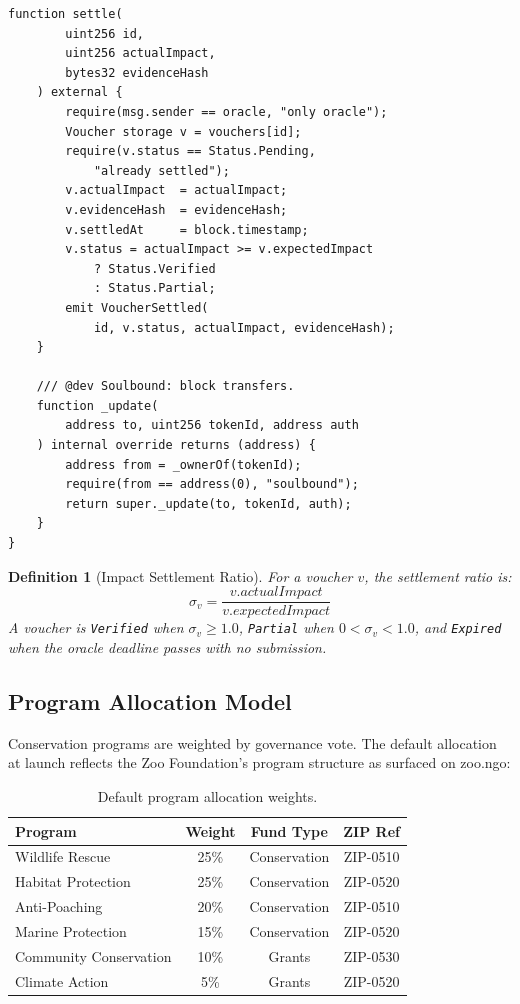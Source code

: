 \documentclass[11pt,letterpaper]{article}
\newtheorem{definition}{Definition}[section]
\begin{document}
\begin{lstlisting}[language=Solidity,caption=ImpactVoucher contract]
    function settle(
        uint256 id,
        uint256 actualImpact,
        bytes32 evidenceHash
    ) external {
        require(msg.sender == oracle, "only oracle");
        Voucher storage v = vouchers[id];
        require(v.status == Status.Pending,
            "already settled");
        v.actualImpact  = actualImpact;
        v.evidenceHash  = evidenceHash;
        v.settledAt     = block.timestamp;
        v.status = actualImpact >= v.expectedImpact
            ? Status.Verified
            : Status.Partial;
        emit VoucherSettled(
            id, v.status, actualImpact, evidenceHash);
    }

    /// @dev Soulbound: block transfers.
    function _update(
        address to, uint256 tokenId, address auth
    ) internal override returns (address) {
        address from = _ownerOf(tokenId);
        require(from == address(0), "soulbound");
        return super._update(to, tokenId, auth);
    }
}
\end{lstlisting}

\begin{definition}[Impact Settlement Ratio]
For a voucher $v$, the settlement ratio is:
\begin{equation}
    \sigma_v = \frac{v.\textit{actualImpact}}{v.\textit{expectedImpact}}
\end{equation}
A voucher is \texttt{Verified} when $\sigma_v \geq 1.0$, \texttt{Partial} when $0 < \sigma_v < 1.0$, and \texttt{Expired} when the oracle deadline passes with no submission.
\end{definition}

\subsection{Program Allocation Model}

Conservation programs are weighted by governance vote. The default allocation at launch reflects the Zoo Foundation's program structure as surfaced on zoo.ngo:

\begin{table}[t]
\centering
\begin{tabular}{lccc}
\toprule
\textbf{Program} & \textbf{Weight} & \textbf{Fund Type} & \textbf{ZIP Ref} \\
\midrule
Wildlife Rescue & 25\% & Conservation & ZIP-0510 \\
Habitat Protection & 25\% & Conservation & ZIP-0520 \\
Anti-Poaching & 20\% & Conservation & ZIP-0510 \\
Marine Protection & 15\% & Conservation & ZIP-0520 \\
Community Conservation & 10\% & Grants & ZIP-0530 \\
Climate Action & 5\% & Grants & ZIP-0520 \\
\bottomrule
\end{tabular}
\caption{Default program allocation weights.}
\label{tab:programs}
\end{table}
\end{document}
